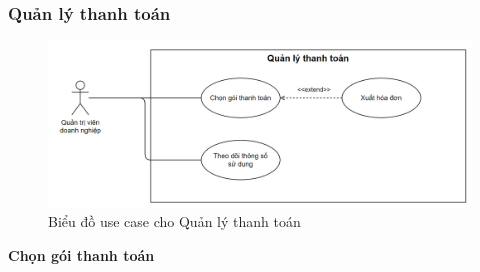 \subsubsection{Quản lý thanh toán}
\begin{figure}[H]
    \centering
    \includegraphics[width=1\linewidth]{Dg_UC/quanlythanhtoan.png}
    \vspace{0.5cm}
    \caption{Biểu đồ use case cho Quản lý thanh toán}
    \label{fig:enter-label}
\end{figure}
\textbf{Chọn gói thanh toán}

